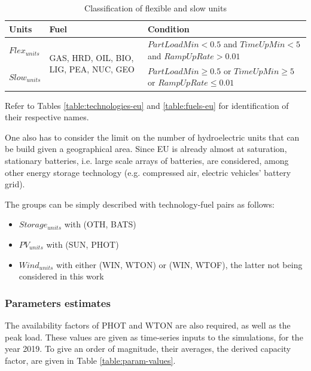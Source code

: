 \begin{table}[h!]
    \centering
	\begin{tabular}{|l | l | p{8cm}|}
		\hline
		Units & Fuel & Condition \\
		\hline
		$Flex_{units}$ & \multirow{2}{3cm}{GAS, HRD, OIL, BIO, LIG, PEA, NUC, GEO} & $PartLoadMin<0.5$ and $TimeUpMin<5$ and $RampUpRate>0.01$\\ \cline{1-1} \cline{3-3}
		$Slow_{units}$ &  & $PartLoadMin\geq 0.5$ or $TimeUpMin \geq 5$ or $RampUpRate\leq 0.01$\\
		\hline
	\end{tabular}
	\caption{Classification of flexible and slow units}
	\label{table:flex-vs-slow-unit}
\end{table}

Refer to Tables \ref{table:technologies-eu} and \ref{table:fuels-eu} for identification of their respective names.

One also has to consider the limit on the number of hydroelectric units that can be build given a geographical area. Since EU is already almost at saturation, stationary batteries, i.e. large scale arrays of batteries, are considered, among other energy storage technology (e.g. compressed air, electric vehicles' battery grid).

The groups can be simply described with technology-fuel pairs as follows:
\begin{itemize}
    \item $Storage_{units}$ with (OTH, BATS)
    \item $PV_{units}$ with (SUN, PHOT)
    \item $Wind_{units}$ with either (WIN, WTON) or (WIN, WTOF), the latter not being considered in this work
\end{itemize}

\subsubsection{Parameters estimates}

The availability factors of PHOT and WTON are also required, as well as the peak load. These values are given as time-series inputs to the simulations, for the year 2019. To give an order of magnitude, their averages, the derived capacity factor, are given in Table \ref{table:param-values}.


